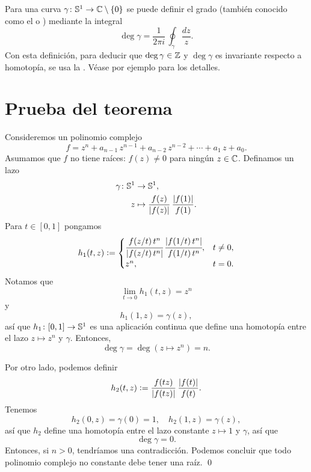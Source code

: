 \documentclass{article}
\numberwithin{equation}{section}
\begin{document}
\begin{comentario}
  Para una curva $\gamma\colon \mathbb{S}^1 \to \mathbb{C} \setminus \{ 0 \}$ se puede definir
  el grado (también conocido como el  o )
  mediante la integral
  $$\deg \gamma = \frac{1}{2\pi i}\,\oint_\gamma \frac{dz}{z}.$$
  Con esta definición, para deducir que $\deg \gamma \in \mathbb{Z}$ y $\deg \gamma$ es
  invariante respecto a homotopía, se usa la
  . Véase por ejemplo
  \cite[Chapter III]{Lang-GTM-103} para los detalles.
\end{comentario}


\section{Prueba del teorema}

Consideremos un polinomio complejo
$$f = z^n + a_{n-1}\,z^{n-1} + a_{n-2}\,z^{n-2} + \cdots + a_1\,z + a_0.$$
Asumamos que $f$ no tiene raíces: $f (z) \ne 0$ para ningún
$z \in \mathbb{C}$. Definamos un lazo
\begin{align*}
  \gamma\colon \mathbb{S}^1 & \to \mathbb{S}^1,\\
  z & \mapsto \frac{f (z)}{|f (z)|}\,\frac{|f (1)|}{f (1)}.
\end{align*}
Para $t \in [0,1]$ pongamos
$$h_1 (t,z) \mathrel{\mathop:}= \begin{cases}
  \cfrac{f (z/t)\,t^n}{|f (z/t)\,t^n|}\,\cfrac{|f (1/t)\,t^n|}{f (1/t)\,t^n}, & t \ne 0,\\
  z^n, & t = 0.
\end{cases}$$
Notamos que
$$\lim_{t\to 0} h_1 (t,z) = z^n$$
y
$$h_1 (1,z) = \gamma (z),$$
así que $h_1\colon [0,1] \to \mathbb{S}^1$ es una aplicación continua que define una
homotopía entre el lazo $z \mapsto z^n$ y $\gamma$. Entonces,
$$\deg \gamma = \deg (z \mapsto z^n) = n.$$

Por otro lado, podemos definir
$$h_2 (t,z) \mathrel{\mathop:}= \frac{f (tz)}{|f (tz)|}\,\frac{|f (t)|}{f (t)}.$$
Tenemos
$$h_2 (0,z) = \gamma (0) = 1, \quad h_2 (1,z) = \gamma (z),$$
así que $h_2$ define una homotopía entre el lazo constante $z \mapsto 1$ y
$\gamma$, así que
$$\deg \gamma = 0.$$
Entonces, si $n > 0$, tendríamos una contradicción. Podemos concluir que todo
polinomio complejo no constante debe tener una raíz. \qed


{\small}
\end{document}
